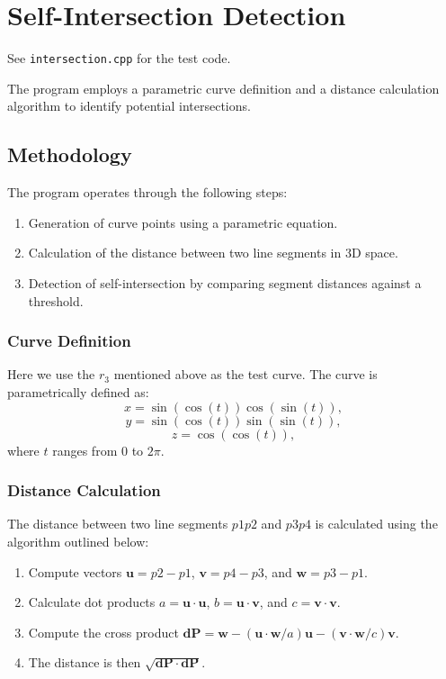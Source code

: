 \documentclass{article}
\begin{document}
\section{Self-Intersection Detection}
See \texttt{intersection.cpp} for the test code.\par
The program employs a parametric curve definition and a distance calculation algorithm to identify potential intersections.
\subsection{Methodology}
The program operates through the following steps:
\begin{enumerate}
    \item Generation of curve points using a parametric equation.
    \item Calculation of the distance between two line segments in 3D space.
    \item Detection of self-intersection by comparing segment distances against a threshold.
\end{enumerate}

\subsubsection{Curve Definition}
Here we use the \(r_3\) mentioned above as the test curve. The curve is parametrically defined as:
\[ x = \sin(\cos(t)) \cos(\sin(t)), \]
\[ y = \sin(\cos(t)) \sin(\sin(t)), \]
\[ z = \cos(\cos(t)), \]
where \( t \) ranges from \( 0 \) to \( 2\pi \).

\subsubsection{Distance Calculation}
The distance between two line segments \( p1p2 \) and \( p3p4 \) is calculated using the algorithm outlined below:
\begin{enumerate}
    \item Compute vectors \( \mathbf{u} = p2 - p1 \), \( \mathbf{v} = p4 - p3 \), and \( \mathbf{w} = p3 - p1 \).
    \item Calculate dot products \( a = \mathbf{u} \cdot \mathbf{u} \), \( b = \mathbf{u} \cdot \mathbf{v} \), and \( c = \mathbf{v} \cdot \mathbf{v} \).
    \item Compute the cross product \( \mathbf{dP} = \mathbf{w} - (\mathbf{u} \cdot \mathbf{w} / a) \mathbf{u} - (\mathbf{v} \cdot \mathbf{w} / c) \mathbf{v} \).
    \item The distance is then \( \sqrt{\mathbf{dP} \cdot \mathbf{dP}} \).
\end{enumerate}
\end{document}
